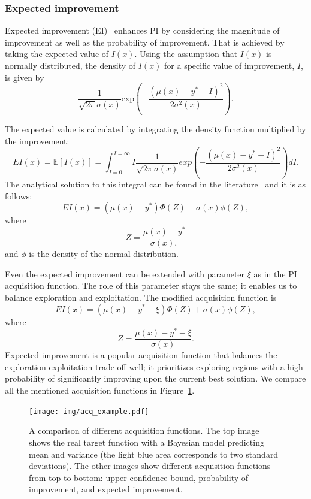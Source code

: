 \subsubsection{Expected improvement}
Expected improvement (EI)~\cite{jones1998efficient} enhances PI by considering the magnitude of improvement as well as the probability of improvement. That is achieved by taking the expected value of $I(x)$. Using the assumption that $I(x)$ is normally distributed, the density of $I(x)$ for a specific value of improvement, $I$, is given by
\[
\frac{1}{\sqrt{2 \pi}\sigma(x)} \text{exp}\left(-\frac{(\mu(x)-y^*-I)^2}{2\sigma^2(x)}\right).
\]

The expected value is calculated by integrating the density function multiplied by the improvement:
\[ EI(x) = \mathbb{E}[I(x)] = \int_{I=0}^{I=\infty} I\frac{1}{\sqrt{2 \pi}\sigma(x)} exp\left(-\frac{(\mu(x)-y^*-I)^2}{2\sigma^2(x)}\right) dI. \]
The analytical solution to this integral can be found in the literature~\cite{jones1998efficient} and it is as follows:
\[ EI(x) = (\mu(x)-y^*)\Phi(Z)+\sigma(x)\phi(Z), \]
where
\[ Z=\frac{\mu(x)-y^*}{\sigma(x),} \]
and $\phi$ is the density of the normal distribution.

Even the expected improvement can be extended with parameter $\xi$ as in the PI acquisition function. The role of this parameter stays the same; it enables us to balance exploration and exploitation. The modified acquisition function is
\[
EI(x) = (\mu(x)-y^*-\xi)\Phi(Z)+\sigma(x)\phi(Z), \]
where
\[ Z=\frac{\mu(x)-y^*-\xi}{\sigma(x)}. \]
 Expected improvement is a popular acquisition function that balances the exploration-exploitation trade-off well; it prioritizes exploring regions with a high probability of significantly improving upon the current best solution. We compare all the mentioned acquisition functions in Figure~\ref{fig:ei}.

 \begin{figure}
    \centering
    \texttt{[image: img/acq\_example.pdf]}
    \caption{A comparison of different acquisition functions. The top image shows the real target function with a Bayesian model predicting mean and variance (the light blue area corresponds to two standard deviations). The other images show different acquisition functions from top to bottom: upper confidence bound, probability of improvement, and expected improvement.}
    \label{fig:ei}
\end{figure}

